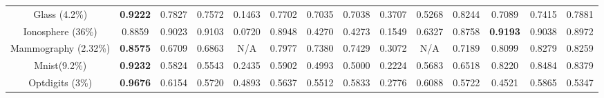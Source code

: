 \documentclass[sigconf,nonacm]{acmart}
\begin{document}
\begin{table*}[h!]
{\begin{tabular}{|p{5cm}||p{5cm}|p{5cm}|p{5cm}|p{5cm}|p{5cm}|p{5cm}|p{5cm}|p{5cm}|p{5cm}|p{5cm}|p{5cm}|p{5cm}|p{5cm}}
    \multicolumn{1}{c||}{Glass (4.2\%)} & \multicolumn{1}{c|}{\textbf{0.9222}} & \multicolumn{1}{c}{0.7827} & \multicolumn{1}{c}{0.7572} &   \multicolumn{1}{c}{0.1463} & \multicolumn{1}{c|}{0.7702} & \multicolumn{1}{c}{0.7035} & \multicolumn{1}{c||}{0.7038} & \multicolumn{1}{c}{0.3707} & \multicolumn{1}{c}{0.5268} & \multicolumn{1}{c}{0.8244} & \multicolumn{1}{c}{0.7089} & \multicolumn{1}{c}{0.7415} & \multicolumn{1}{c}{0.7881}\\
    
    \multicolumn{1}{c||}{Ionosphere (36\%)} & \multicolumn{1}{c|}{0.8859} & \multicolumn{1}{c}{0.9023} & \multicolumn{1}{c}{0.9103} &   \multicolumn{1}{c}{0.0720} & \multicolumn{1}{c|}{0.8948} & \multicolumn{1}{c}{0.4270} & \multicolumn{1}{c||}{0.4273} & \multicolumn{1}{c}{0.1549} & \multicolumn{1}{c}{0.6327} & \multicolumn{1}{c}{0.8758} & \multicolumn{1}{c}{\textbf{0.9193}} & \multicolumn{1}{c}{0.9038} & \multicolumn{1}{c}{0.8972}\\
    
    \multicolumn{1}{c||}{Mammography (2.32\%)} & \multicolumn{1}{c|}{\textbf{0.8575}} & \multicolumn{1}{c}{0.6709} & \multicolumn{1}{c}{0.6863} &   \multicolumn{1}{c}{N/A} & \multicolumn{1}{c|}{0.7977} & \multicolumn{1}{c}{0.7380} & \multicolumn{1}{c||}{0.7429} & \multicolumn{1}{c}{0.3072} & \multicolumn{1}{c}{N/A} & \multicolumn{1}{c}{0.7189} & \multicolumn{1}{c}{0.8099} & \multicolumn{1}{c}{0.8279} & \multicolumn{1}{c}{0.8259}\\
    
    \multicolumn{1}{c||}{Mnist(9.2\%)} & \multicolumn{1}{c|}{\textbf{0.9232}} & \multicolumn{1}{c}{0.5824} & \multicolumn{1}{c}{0.5543} &   \multicolumn{1}{c}{0.2435} & \multicolumn{1}{c|}{0.5902} & \multicolumn{1}{c}{0.4993} & \multicolumn{1}{c||}{0.5000} & \multicolumn{1}{c}{0.2224} & \multicolumn{1}{c}{0.5683} & \multicolumn{1}{c}{0.6518} & \multicolumn{1}{c}{0.8220} & \multicolumn{1}{c}{0.8484} & \multicolumn{1}{c}{0.8379}\\
    
    \multicolumn{1}{c||}{Optdigits (3\%)} & \multicolumn{1}{c|}{\textbf{0.9676}} & \multicolumn{1}{c}{0.6154} & \multicolumn{1}{c}{0.5720} &   \multicolumn{1}{c}{0.4893} & \multicolumn{1}{c|}{0.5637} & \multicolumn{1}{c}{0.5512} & \multicolumn{1}{c||}{0.5833} & \multicolumn{1}{c}{0.2776} & \multicolumn{1}{c}{0.6088} & \multicolumn{1}{c}{0.5722} & \multicolumn{1}{c}{0.4521} & \multicolumn{1}{c}{0.5865} & \multicolumn{1}{c}{0.5347}\\
    

\end{tabular}}
\end{table*}
\end{document}
